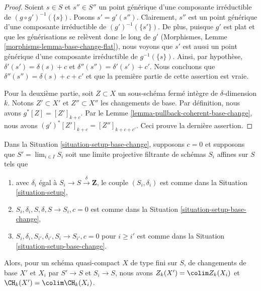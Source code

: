 \begin{proof}
Soient $s \in S$ et $s'' \in S''$ un point générique d'une composante
irréductible de $(g \circ g')^{-1}(\{s\})$. Posons $s' = g'(s'')$.
Clairement, $s''$ est un point générique d'une composante irréductible de
$(g')^{-1}(\{s'\})$. De plus, puisque $g'$ est plat et que les générisations
se relèvent donc le long de $g'$ (Morphismes, Lemme \ref{morphisms-lemma-base-change-flat}),
nous voyons que $s'$ est aussi un point générique d'une composante irréductible
de $g^{-1}(\{s\})$. Ainsi, par hypothèse, $\delta'(s') = \delta(s) + c$
et $\delta''(s'') = \delta'(s') + c'$. Nous concluons que
$\delta''(s'') = \delta(s) + c + c'$ et que la première partie de cette
assertion est vraie.

\medskip\noindent
Pour la deuxième partie, soit $Z \subset X$ un sous-schéma fermé intègre
de $\delta$-dimension $k$. Notons $Z' \subset X'$ et $Z'' \subset X''$
les changements de base. Par définition, nous avons $g^*[Z] = [Z']_{k + c}$.
Par le Lemme \ref{lemma-pullback-coherent-base-change}, nous avons
$(g')^*[Z']_{k + c} = [Z'']_{k + c + c'}$. Ceci prouve la dernière assertion.
\end{proof}

\begin{lemma}
\label{lemma-chow-limit}
Dans la Situation \ref{situation-setup-base-change}, supposons $c = 0$
et supposons que $S' = \lim_{i \in I} S_i$ soit une limite projective filtrante
de schémas $S_i$ affines sur $S$ tels que
\begin{enumerate}
\item avec $\delta_i$ égal à $S_i \to S \xrightarrow{\delta} \mathbf{Z}$,
le couple $(S_i, \delta_i)$ est comme dans la Situation \ref{situation-setup},
\item $S_i, \delta_i, S, \delta, S \to S_i, c = 0$ est comme dans la
Situation \ref{situation-setup-base-change},
\item $S_i, \delta_i, S_{i'}, \delta_{i'}, S_i \to S_{i'}, c = 0$ 
pour $i \geq i'$ est comme dans la Situation \ref{situation-setup-base-change}.
\end{enumerate}
Alors, pour un schéma quasi-compact $X$ de type fini sur $S$,
de changements de base $X'$ et $X_i$ par $S' \to S$ et $S_i \to S$, nous avons
$Z_k(X') = \colim Z_k(X_i)$ et $\CH_k(X') = \colim \CH_k(X_i)$.
\end{lemma}

